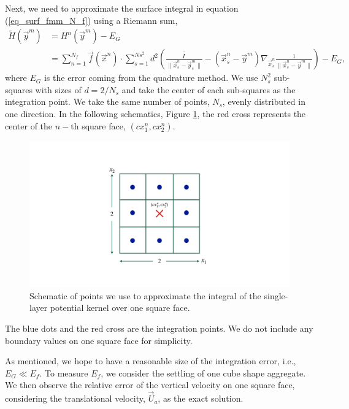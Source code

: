 \par
Next, we need to approximate the surface integral in equation (\ref{eq_surf_fmm_N_f}) using a Riemann sum,
\begin{align}
	\tilde{H}(\vec{y}^m) 
	& = H^n(\vec{y}^m) - E_{G} 
	\nonumber \\ 
	& =
	\sum_{n = 1}^{N_f} 
	\vec{f}(\vec{x}^n) \cdot
	\sum_{s=1}^{Ns^2} d^2 
  	\left(
  	\frac{\bar{\bar{I \ }}}{\|\vec{x}_s^n - \vec{y}_s^m\|}
  	- \left( \vec{x}_s^n - \vec{y}^m \right)
  	 \nabla_{\vec{x}_s^n}
  	\frac{1}{\|\vec{x}_s^n - \vec{y}^m\|}
  	\right)
	  - E_{G},
 \label{eq_surf_fmm_N_f_n}
\end{align}
where $E_G$ is the error coming from the quadrature method. 
We use $N_s^2$ sub-squares with sizes of $d = 2/N_s$ and take the center of each sub-squares as the integration point. 
We take the same number of points, $N_s$, evenly distributed in one direction. 
In the following schematics, Figure \ref{fig_face_grid}, the red cross represents the center of the $n-$th square face, $(cx^n_1, cx^n_2)$.
\begin{figure}[h]
	\begin{center}
		\includegraphics[scale=0.17]{./figures/fig_face_grid}
	\caption{Schematic of points we use to approximate the integral of the single-layer potential kernel over one square face.}
	\label{fig_face_grid}
\end{center}
\end{figure}
The blue dots and the red cross are the integration points.
We do not include any boundary values on one square face for simplicity.
\par
As mentioned, we hope to have a reasonable size of the integration error, i.e., $E_G \ll E_f$.
To measure $E_f$, we consider the settling of one cube shape aggregate.
We then observe the relative error of the vertical velocity on one square face, considering the translational velocity, $\vec{U}_a$, as the exact solution.
